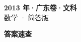 \documentclass[zihao=-4, a4paper]{ctexart}
\begin{document}
\begin{center}
  {\Large\bfseries 2013 年·广东卷·文科}\\[4pt]
  {\large 数学 · 简答版}
\end{center}
\medskip
{}

\clearpage
{}
\begin{center}{\Large\bfseries 答案速查}\end{center}
\medskip

\end{document}
